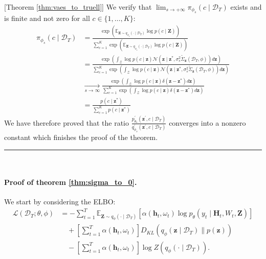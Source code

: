 \documentclass[10pt]{article} %
\newcommand{\BlackBox}{\rule{1.5ex}{1.5ex}}  %
\renewenvironment{proof}{\par\noindent{\bf Proof\ }}{\hfill\BlackBox\\[2mm]}
\newenvironment{proof}{\par\noindent{\bf Proof\ }}{\hfill\BlackBox\\[2mm]}
\begin{document}
\begin{proof}[Theorem \ref{thm:vaes_to_truell}]
We verify that \(\lim_{s \to +\infty} \pi_{\phi_{s}}(c \mid \mathcal{D}_T)\) exists and is finite and not zero for all \(c \in \{1, \dots, K\}\):
\begin{align*}
\pi_{\phi_{s}}(c \mid \mathcal{D}_T)
&= \frac{\exp(\mathbb{E}_{\mathbf{Z} \sim q_{\phi_z}(\cdot \mid \mathcal{D}_T)} \log p(c \mid \mathbf{Z}))
    }{
    \sum_{c=1}^K \exp(\mathbb{E}_{\mathbf{Z} \sim q_{\phi_z}(\cdot \mid \mathcal{D}_T)} \log p(c \mid \mathbf{Z}))} \\
&= \frac{
                \exp(
                \int_{\mathcal{Z}} \log p(c\mid\mathbf{z}) \mathcal{N}\left(
        \mathbf{z} \mid \mathbf{z}^*,         
         \sigma_{s}^{2}  \tilde{\Sigma}_{\mathbf{z}}(\mathcal{D}_T, \phi) 
        \right)  d\mathbf{z}
                )
                }{
                \sum_{c=1}^K \exp(
                \int_{\mathcal{Z}} \log p(c\mid\mathbf{z}) \mathcal{N}\left(
        \mathbf{z} \mid \mathbf{z}^*,         
         \sigma_{s}^{2}  \tilde{\Sigma}_{\mathbf{z}}(\mathcal{D}_T, \phi) 
        \right)  d\mathbf{z}
                )
                } \\
&\underset{s \to \infty}{\to} \frac{
                \exp(
                \int_{\mathcal{Z}} \log p(c\mid\mathbf{z}) \delta(\mathbf{z} - \mathbf{z}^*)  d\mathbf{z}
                )
                }{
                \sum_{c=1}^K \exp(
                \int_{\mathcal{Z}} \log p(c\mid\mathbf{z})  \delta(\mathbf{z} - \mathbf{z}^*)  d\mathbf{z}
                )
                } \\
&= \frac{
                 p(c\mid\mathbf{z}^*)
                }{
                \sum_{c=1}^K  p(c\mid\mathbf{z}^*)
                } 
\end{align*}
We have therefore proved that the ratio \(\frac{p_{\theta_{s}}^{\prime}\left(\mathbf{z}^{\prime}, c \mid \mathcal{D}_T\right)}{q_{\phi_{s}}^{\prime}(\mathbf{z}^{\prime}, c \mid \mathcal{D}_T)} \)  converges into a nonzero constant which finishes the proof of the theorem.
\end{proof}



\paragraph{Proof of theorem \ref{thm:sigma_to_0}.} We start by considering the ELBO:
\begin{equation*}
\begin{split}
    \mathcal{L}(\mathcal{D}_T; \theta, \phi) 
    &=  -\sum_{t = 1}^{T} \mathbb{E}_{\mathbf{Z} \sim q_{\phi}(\cdot \mid \mathcal{D}_T)} 
    \left[ \alpha(\mathbf{h}_t, \omega_t) \log p_{\theta}(y_{t} \mid \mathbf{H}_t, W_t, \mathbf{Z}) \right] \\
    &\quad + \left[\sum_{t = 1}^{T}\alpha(\mathbf{h}_t, \omega_t)\right] D_{KL}\left(q_{\phi}(\mathbf{z} \mid \mathcal{D}_T) \parallel p(\mathbf{z})\right) \\
    &\quad - \left[\sum_{t = 1}^{T}\alpha(\mathbf{h}_t, \omega_t)\right] \log Z(q_{\phi}(\cdot \mid \mathcal{D}_T)).
\end{split}
\end{equation*}
\end{document}
